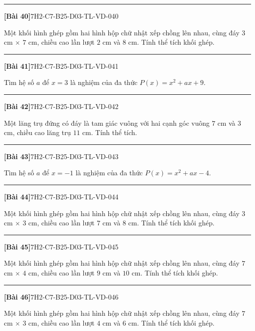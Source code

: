 \documentclass[12pt,a4paper]{article}
\newif\ifloigiai
\newenvironment{cauhoi}[2]{%
  \par\medskip\noindent\rule{\textwidth}{0.4pt}\par\nopagebreak
  \noindent\textbf{[#1]}\hfill{\scriptsize\ttfamily #2}\par\nopagebreak\smallskip}{\par}
\newcommand{\loigiai}[1]{\ifloigiai\par\smallskip\noindent\textit{Lời giải.} #1\par\fi}
\begin{document}
\begin{cauhoi}{Bài 40}{7H2-C7-B25-D03-TL-VD-040}
Một khối hình ghép gồm hai hình hộp chữ nhật xếp chồng lên nhau, cùng đáy $3$ cm $\times$ $7$ cm, chiều cao lần lượt $2$ cm và $8$ cm. Tính thể tích khối ghép.
\loigiai{Thể tích hai khối là $3\cdot 7\cdot 2=42$ và $3\cdot 7\cdot 8=168$ ($\text{cm}^3$). Thể tích khối ghép là $42+168=210$ ($\text{cm}^3$).}
\end{cauhoi}
\begin{cauhoi}{Bài 41}{7H2-C7-B25-D03-TL-VD-041}
Tìm hệ số $a$ để $x=3$ là nghiệm của đa thức $P(x)=x^{2}+ax+9$.
\loigiai{$x=3$ là nghiệm nên $P(3)=0$: $9+3\cdot a+9=0$ nên $3a=-18$, suy ra $a=-6$.}
\end{cauhoi}
\begin{cauhoi}{Bài 42}{7H2-C7-B25-D03-TL-VD-042}
Một lăng trụ đứng có đáy là tam giác vuông với hai cạnh góc vuông $7$ cm và $3$ cm, chiều cao lăng trụ $11$ cm. Tính thể tích.
\loigiai{Diện tích đáy là $\dfrac{7\cdot 3}{2}=10,5$ ($\text{cm}^2$). Thể tích là $10,5\cdot 11=115,5$ ($\text{cm}^3$).}
\end{cauhoi}
\begin{cauhoi}{Bài 43}{7H2-C7-B25-D03-TL-VD-043}
Tìm hệ số $a$ để $x=-1$ là nghiệm của đa thức $P(x)=x^{2}+ax-4$.
\loigiai{$x=-1$ là nghiệm nên $P(-1)=0$: $1-1\cdot a-4=0$ nên $-a=3$, suy ra $a=-3$.}
\end{cauhoi}
\begin{cauhoi}{Bài 44}{7H2-C7-B25-D03-TL-VD-044}
Một khối hình ghép gồm hai hình hộp chữ nhật xếp chồng lên nhau, cùng đáy $3$ cm $\times$ $3$ cm, chiều cao lần lượt $7$ cm và $8$ cm. Tính thể tích khối ghép.
\loigiai{Thể tích hai khối là $3\cdot 3\cdot 7=63$ và $3\cdot 3\cdot 8=72$ ($\text{cm}^3$). Thể tích khối ghép là $63+72=135$ ($\text{cm}^3$).}
\end{cauhoi}
\begin{cauhoi}{Bài 45}{7H2-C7-B25-D03-TL-VD-045}
Một khối hình ghép gồm hai hình hộp chữ nhật xếp chồng lên nhau, cùng đáy $7$ cm $\times$ $4$ cm, chiều cao lần lượt $9$ cm và $10$ cm. Tính thể tích khối ghép.
\loigiai{Thể tích hai khối là $7\cdot 4\cdot 9=252$ và $7\cdot 4\cdot 10=280$ ($\text{cm}^3$). Thể tích khối ghép là $252+280=532$ ($\text{cm}^3$).}
\end{cauhoi}
\begin{cauhoi}{Bài 46}{7H2-C7-B25-D03-TL-VD-046}
Một khối hình ghép gồm hai hình hộp chữ nhật xếp chồng lên nhau, cùng đáy $7$ cm $\times$ $3$ cm, chiều cao lần lượt $4$ cm và $6$ cm. Tính thể tích khối ghép.
\loigiai{Thể tích hai khối là $7\cdot 3\cdot 4=84$ và $7\cdot 3\cdot 6=126$ ($\text{cm}^3$). Thể tích khối ghép là $84+126=210$ ($\text{cm}^3$).}
\end{cauhoi}
\end{document}
